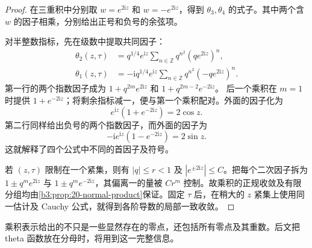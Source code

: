 \begin{proof}
在三重积中分别取 \(w=e^{2\mathrm iz}\) 和 \(w=-e^{2\mathrm iz}\)，得到 \(\theta_3,\theta_4\) 的式子。其中两个含 \(w\) 的因子相乘，分别给出正号和负号的余弦项。

对半整数指标，先在级数中提取共同因子：
\[
 \begin{aligned}
 \theta_2(z,\tau)
 &=q^{1/4}e^{\mathrm iz}
   \sum_{n\in\mathbb Z}q^{n^2}(qe^{2\mathrm iz})^n,\\
 \theta_1(z,\tau)
 &=-\mathrm i q^{1/4}e^{\mathrm iz}
   \sum_{n\in\mathbb Z}q^{n^2}(-qe^{2\mathrm iz})^n.
 \end{aligned}
\]
第一行的两个指数因子成为
\(1+q^{2m}e^{2\mathrm iz}\) 和
\(1+q^{2m-2}e^{-2\mathrm iz}\)。
后一个乘积在 \(m=1\) 时提供 \(1+e^{-2\mathrm iz}\)；将剩余指标减一，便与第一个乘积配对。外面的因子化为
\[
 e^{\mathrm iz}(1+e^{-2\mathrm iz})=2\cos z.
\]
第二行同样给出负号的两个指数因子，而外面的因子为
\[
 -\mathrm i e^{\mathrm iz}(1-e^{-2\mathrm iz})=2\sin z.
\]
这就解释了四个公式中不同的首因子及符号。

若 \((z,\tau)\) 限制在一个紧集，则有 \(|q|\le r<1\) 及
\(|e^{\pm2\mathrm iz}|\le C\)。把每个二次因子拆为
\(1\pm q^m e^{2\mathrm iz}\) 与 \(1\pm q^m e^{-2\mathrm iz}\)，其偏离一的量被 \(Cr^m\) 控制。故乘积的正规收敛及有限分组均由\cref{b3:prop:20-normal-product}保证。固定 \(\tau\) 后，在稍大的 \(z\) 紧集上使用同一估计及 Cauchy 公式，就得到各阶导数的局部一致收敛。
\end{proof}

乘积表示给出的不只是一些显然存在的零点，还包括所有零点及其重数。后文把 theta 函数放在分母时，将用到这一完整信息。

